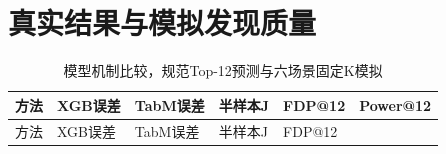 \documentclass{sufethesismas}
\begin{document}
\section{真实结果与模拟发现质量}

{
\footnotesize
\begin{longtable}[]{@{}
  >{\raggedright\arraybackslash}p{}
  >{\raggedright\arraybackslash}p{}
  >{\raggedright\arraybackslash}p{}
  >{\raggedright\arraybackslash}p{}
  >{\raggedright\arraybackslash}p{}
  >{\raggedright\arraybackslash}p{}@{}}
\caption{模型机制比较，规范Top-12预测与六场景固定K模拟}\tabularnewline
\toprule\noalign{}
\begin{minipage}[b]{\linewidth}\raggedright
方法
\end{minipage} & \begin{minipage}[b]{\linewidth}\raggedright
XGB误差
\end{minipage} & \begin{minipage}[b]{\linewidth}\raggedright
TabM误差
\end{minipage} & \begin{minipage}[b]{\linewidth}\raggedright
半样本J
\end{minipage} & \begin{minipage}[b]{\linewidth}\raggedright
FDP@12
\end{minipage} & \begin{minipage}[b]{\linewidth}\raggedright
Power@12
\end{minipage} \\
\midrule\noalign{}
\endfirsthead
\toprule\noalign{}
\begin{minipage}[b]{\linewidth}\raggedright
方法
\end{minipage} & \begin{minipage}[b]{\linewidth}\raggedright
XGB误差
\end{minipage} & \begin{minipage}[b]{\linewidth}\raggedright
TabM误差
\end{minipage} & \begin{minipage}[b]{\linewidth}\raggedright
半样本J
\end{minipage} & \begin{minipage}[b]{\linewidth}\raggedright
FDP@12
\end{minipage} & \begin{minipage}[b]{\linewidth}\raggedright

\end{minipage}
\end{longtable}}
\end{document}
